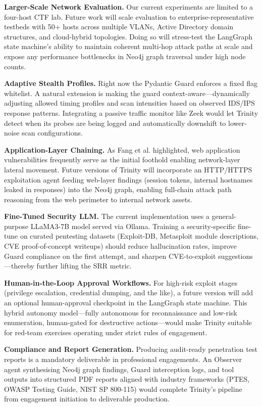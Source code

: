 \documentclass[conference]{IEEEtran}
\begin{document}
\textbf{Larger-Scale Network Evaluation.} Our current experiments are limited to a four-host CTF lab. Future work will scale evaluation to enterprise-representative testbeds with 50+ hosts across multiple VLANs, Active Directory domain structures, and cloud-hybrid topologies. Doing so will stress-test the LangGraph state machine's ability to maintain coherent multi-hop attack paths at scale and expose any performance bottlenecks in Neo4j graph traversal under high node counts.

\textbf{Adaptive Stealth Profiles.} Right now the Pydantic Guard enforces a fixed flag whitelist. A natural extension is making the guard context-aware---dynamically adjusting allowed timing profiles and scan intensities based on observed IDS/IPS response patterns. Integrating a passive traffic monitor like Zeek would let Trinity detect when its probes are being logged and automatically downshift to lower-noise scan configurations.

\textbf{Application-Layer Chaining.} As Fang et al. \cite{fang2024hack} highlighted, web application vulnerabilities frequently serve as the initial foothold enabling network-layer lateral movement. Future versions of Trinity will incorporate an HTTP/HTTPS exploitation agent feeding web-layer findings (session tokens, internal hostnames leaked in responses) into the Neo4j graph, enabling full-chain attack path reasoning from the web perimeter to internal network assets.

\textbf{Fine-Tuned Security LLM.} The current implementation uses a general-purpose LLaMA3-7B model served via Ollama. Training a security-specific fine-tune on curated pentesting datasets (Exploit-DB, Metasploit module descriptions, CVE proof-of-concept writeups) should reduce hallucination rates, improve Guard compliance on the first attempt, and sharpen CVE-to-exploit suggestions---thereby further lifting the SRR metric.

\textbf{Human-in-the-Loop Approval Workflows.} For high-risk exploit stages (privilege escalation, credential dumping, and the like), a future version will add an optional human-approval checkpoint in the LangGraph state machine. This hybrid autonomy model---fully autonomous for reconnaissance and low-risk enumeration, human-gated for destructive actions---would make Trinity suitable for red-team exercises operating under strict rules of engagement.

\textbf{Compliance and Report Generation.} Producing audit-ready penetration test reports is a mandatory deliverable in professional engagements. An Observer agent synthesising Neo4j graph findings, Guard interception logs, and tool outputs into structured PDF reports aligned with industry frameworks (PTES, OWASP Testing Guide, NIST SP 800-115) would complete Trinity's pipeline from engagement initiation to deliverable production.
\end{document}
